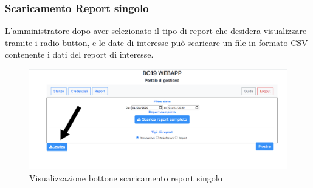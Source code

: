 \subsubsection{Scaricamento Report singolo}
L'amministratore dopo aver selezionato il tipo di report che desidera visualizzare tramite i radio button, e le date di interesse può scaricare un file in formato CSV contenente i dati del report di interesse.
\begin{figure}[H]
	\centering
	\includegraphics[width=15cm]{res/images/ReportSingolo.png}
	\caption{Visualizzazione bottone scaricamento report singolo}
\end{figure}

